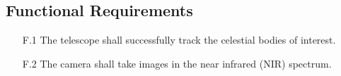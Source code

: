 \subsection{Functional Requirements}

\begin{enumerate}
    \item[F.1] The telescope shall successfully track the celestial bodies of interest.
    \item[F.2] The camera shall take images in the near infrared (NIR) spectrum.
\end{enumerate}
